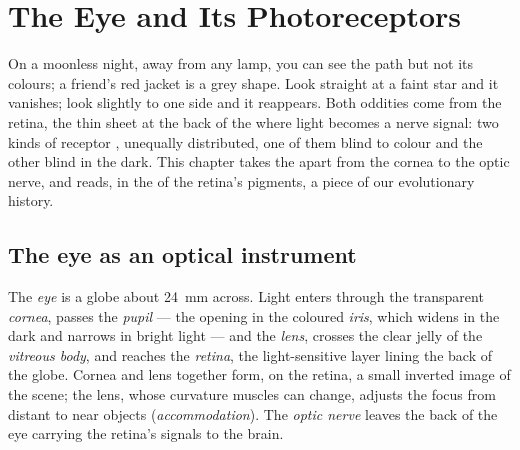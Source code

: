 \chapter{The Eye and Its Photoreceptors}\label{ch:g11:the-eye}

On a moonless night, away from any lamp, you can see the path but not
its colours; a friend's red jacket is a grey shape. Look straight at a
faint star and it vanishes; look slightly to one side and it
reappears. Both oddities come from the retina, the thin sheet at the
back of the  where light becomes a nerve signal: two kinds of
receptor , unequally distributed, one of them blind to colour and
the other blind in the dark. This chapter takes the  apart from the
cornea to the optic nerve, and reads, in the  of the retina's
pigments, a piece of our evolutionary history.

\section{The eye as an optical instrument}

\begin{definition}\label{def:g11:the-eye:parts}
The \emph{eye} is a globe about \qty{24}{mm} across. Light
enters through the transparent \emph{cornea}, passes the \emph{pupil}
--- the opening in the coloured \emph{iris}, which widens in the dark
and narrows in bright light --- and the \emph{lens}, crosses the clear
jelly of the \emph{vitreous body}, and reaches the \emph{retina}, the
light-sensitive layer lining the back of the globe. Cornea and lens
together form, on the retina, a small inverted image of the scene; the
lens, whose curvature muscles can change, adjusts the focus from
distant to near objects (\emph{accommodation}). The
\emph{optic nerve} leaves the back of the eye carrying the retina's
signals to the brain.
\end{definition}

